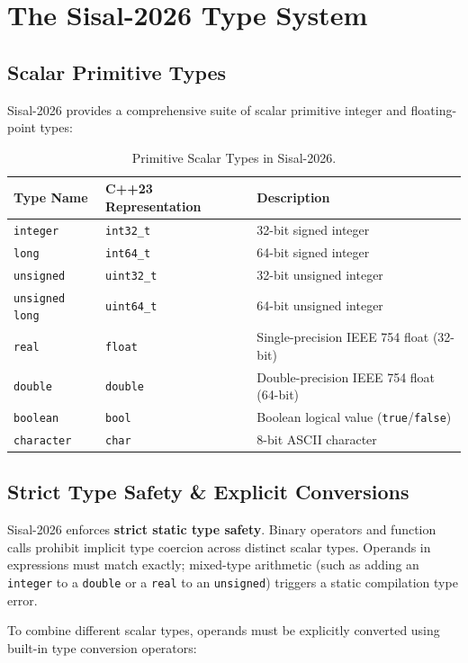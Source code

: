 \chapter{The Sisal-2026 Type System}
\label{chap:type_system}

\section{Scalar Primitive Types}
Sisal-2026 provides a comprehensive suite of scalar primitive integer and floating-point types:
\begin{table}[h!]
\centering
\begin{tabularx}{\textwidth}{llX}
\toprule
\textbf{Type Name} & \textbf{C++23 Representation} & \textbf{Description} \\
\midrule
\texttt{integer} & \texttt{int32\_t} & 32-bit signed integer \\
\texttt{long} & \texttt{int64\_t} & 64-bit signed integer \\
\texttt{unsigned} & \texttt{uint32\_t} & 32-bit unsigned integer \\
\texttt{unsigned long} & \texttt{uint64\_t} & 64-bit unsigned integer \\
\texttt{real} & \texttt{float} & Single-precision IEEE 754 float (32-bit) \\
\texttt{double} & \texttt{double} & Double-precision IEEE 754 float (64-bit) \\
\texttt{boolean} & \texttt{bool} & Boolean logical value (\texttt{true}/\texttt{false}) \\
\texttt{character} & \texttt{char} & 8-bit ASCII character \\
\bottomrule
\end{tabularx}
\caption{Primitive Scalar Types in Sisal-2026.}
\label{tab:primitive_types}
\end{table}

\section{Strict Type Safety \& Explicit Conversions}
Sisal-2026 enforces \textbf{strict static type safety}. Binary operators and function calls prohibit implicit type coercion across distinct scalar types. Operands in expressions must match exactly; mixed-type arithmetic (such as adding an \texttt{integer} to a \texttt{double} or a \texttt{real} to an \texttt{unsigned}) triggers a static compilation type error.

To combine different scalar types, operands must be explicitly converted using built-in type conversion operators:

